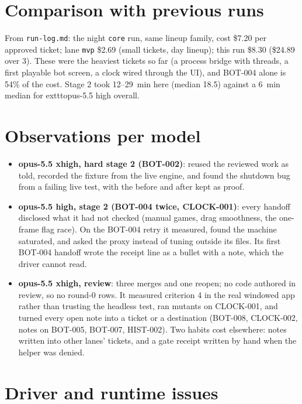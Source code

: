 \documentclass[11pt,a4paper]{article}
\begin{document}
\section*{Comparison with previous runs}

From \texttt{run-log.md}: the night \texttt{core} run, same lineup family, cost \$7.20 per
approved ticket; lane \texttt{mvp} \$2.69 (small tickets, day lineup); this run \$8.30
(\$24.89 over 3). These were the heaviest tickets so far (a process bridge with threads, a
first playable bot screen, a clock wired through the UI), and BOT-004 alone is 54\% of the
cost. Stage 2 took 12--29~min here (median 18.5) against a 6~min median for 	exttt{opus-5.5 high} overall.

\section*{Observations per model}

\begin{itemize}
  \item \textbf{opus-5.5 xhigh, hard stage 2 (BOT-002)}: reused the reviewed work as told,
        recorded the fixture from the live engine, and found the shutdown bug from a failing
        live test, with the before and after kept as proof.
  \item \textbf{opus-5.5 high, stage 2 (BOT-004 twice, CLOCK-001)}: every handoff disclosed
        what it had not checked (manual games, drag smoothness, the one-frame flag race). On
        the BOT-004 retry it measured, found the machine saturated, and asked the proxy
        instead of tuning  outside its files. Its first BOT-004 handoff
        wrote the receipt line as a bullet with a note, which the driver cannot read.
  \item \textbf{opus-5.5 xhigh, review}: three merges and one reopen; no code authored in
        review, so no round-0 rows. It measured criterion 4 in the real windowed app rather
        than trusting the headless test, ran mutants on CLOCK-001, and turned every open note
        into a ticket or a destination (BOT-008, CLOCK-002, notes on BOT-005, BOT-007,
        HIST-002). Two habits cost elsewhere: notes written into other lanes' tickets, and a
        gate receipt written by hand when the helper was denied.
\end{itemize}

\section*{Driver and runtime issues}
\end{document}
